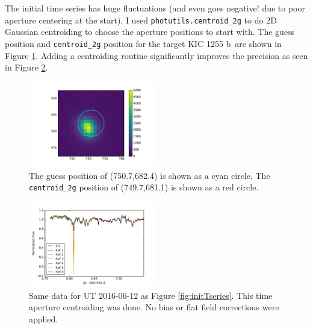 \documentclass[twocolumn]{aastex61}
\newcommand{\sha}{KIC 1255 b}
\begin{document}
The initial time series has huge fluctuations (and even goes negative! due to poor aperture centering at the start).
I used \texttt{photutils.centroid\_2g} to do 2D Gaussian centroiding to choose the aperture positions to start with.
The guess position and \texttt{centroid\_2g} position for the target \sha\ are shown in Figure \ref{fig:centroid2g}.
Adding a centroiding routine significantly improves the precision as seen in Figure \ref{fig:secTseries}.

\begin{figure}
\begin{centering}
\includegraphics[width=0.5\textwidth]{centering.pdf}
\caption{The guess position of (750.7,682.4) is shown as a cyan circle. The \texttt{centroid\_2g} position of (749.7,681.1) is shown as a red circle.}\label{fig:centroid2g}
\end{centering}
\end{figure}

\begin{figure}
\begin{centering}
\includegraphics[width=0.5\textwidth]{second_t_series.pdf}
\caption{Same data for UT 2016-06-12 as Figure \ref{fig:initTseries}.
This time aperture centroiding was done.
No bias or flat field corrections were applied.}\label{fig:secTseries}
\end{centering}
\end{figure}
\end{document}
